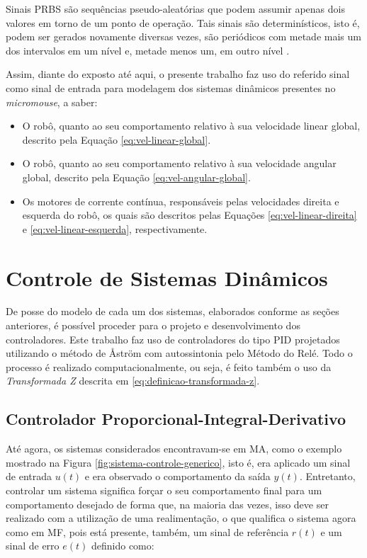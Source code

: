 			Sinais \gls{PRBS} são sequências pseudo-aleatórias que podem assumir apenas dois valores em torno de um ponto de operação. Tais sinais são determinísticos, isto é, podem ser gerados novamente diversas vezes, são periódicos com metade mais um dos intervalos em um nível e, metade menos um, em outro nível \cite{aguirre-identificacao-2007}.
			
			Assim, diante do exposto até aqui, o presente trabalho faz uso do referido sinal como sinal de entrada para modelagem dos sistemas dinâmicos presentes no \textit{micromouse}, a saber:

			\begin{itemize}
				\item O robô, quanto ao seu comportamento relativo à sua velocidade linear global, descrito pela Equação \ref{eq:vel-linear-global}.
				\item O robô, quanto ao seu comportamento relativo à sua velocidade angular global, descrito pela Equação \ref{eq:vel-angular-global}.
				\item Os motores de corrente contínua, responsáveis pelas velocidades direita e esquerda do robô, os quais são descritos pelas Equações \ref{eq:vel-linear-direita} e \ref{eq:vel-linear-esquerda}, respectivamente.
			\end{itemize}
				
    \section{Controle de Sistemas Dinâmicos} \label{sec:controle-teoria}

		
		De posse do modelo de cada um dos sistemas, elaborados conforme as seções anteriores, é possível proceder para o projeto e desenvolvimento dos controladores. Este trabalho faz uso de controladores do tipo \gls{PID} projetados utilizando o método de {\AA}str{\"o}m com autossintonia pelo Método do Relé. Todo o processo é realizado computacionalmente, ou seja, é feito também o uso da \textit{Transformada Z} descrita em \ref{eq:definicao-transformada-z}.

		\subsection{Controlador Proporcional-Integral-Derivativo} \label{ssec:teoria-pid}

			Até agora, os sistemas considerados encontravam-se em \gls{MA}, como o exemplo mostrado na Figura \ref{fig:sistema-controle-generico}, isto é, era aplicado um sinal de entrada $u(t)$ e era observado o comportamento da saída $y(t)$. Entretanto, controlar um sistema significa forçar o seu comportamento final para um comportamento desejado de forma que, na maioria das vezes, isso deve ser realizado com a utilização de uma realimentação, o que qualifica o sistema agora como em \gls{MF}, pois está presente, também, um sinal de referência $r(t)$ e um sinal de erro $e(t)$ definido como:

